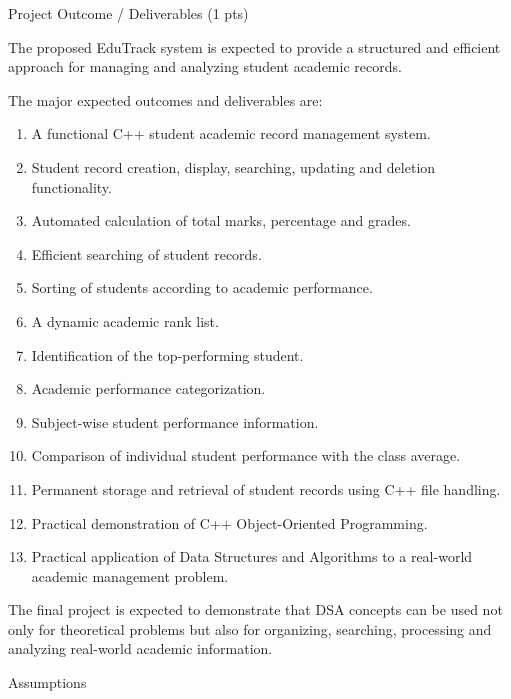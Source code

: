 \documentclass[11pt,a4paper]{article}
\newcommand{\blueheading}[1]{%
  {\sffamily\color{TitleBlue}\fontsize{15}{18}\selectfont #1}%
}
\begin{document}
\blueheading{Project Outcome / Deliverables (1 pts)}

\vspace{8mm}
\begin{answerbox}
The proposed EduTrack system is expected to provide a structured and efficient approach for managing and analyzing student academic records.

The major expected outcomes and deliverables are:
\begin{enumerate}[leftmargin=7mm,itemsep=1.5pt,topsep=2pt,parsep=0pt]
\item A functional C++ student academic record management system.
\item Student record creation, display, searching, updating and deletion functionality.
\item Automated calculation of total marks, percentage and grades.
\item Efficient searching of student records.
\item Sorting of students according to academic performance.
\item A dynamic academic rank list.
\item Identification of the top-performing student.
\item Academic performance categorization.
\item Subject-wise student performance information.
\item Comparison of individual student performance with the class average.
\item Permanent storage and retrieval of student records using C++ file handling.
\item Practical demonstration of C++ Object-Oriented Programming.
\item Practical application of Data Structures and Algorithms to a real-world academic management problem.
\end{enumerate}

The final project is expected to demonstrate that DSA concepts can be used not only for theoretical problems but also for organizing, searching, processing and analyzing real-world academic information.
\end{answerbox}

\vspace{7mm}
\blueheading{Assumptions}
\end{document}
